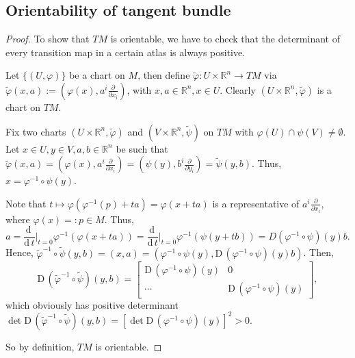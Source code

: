 
{

\newcommand*{\R}{\mathbb{R}} %
\renewcommand*{\d}{\mathrm{d}\,} %
\newcommand*{\D}{\mathrm{D}\,} %


\subsection{Orientability of tangent bundle}

\begin{proof}
To show that $TM$ is orientable, we have to check that the determinant of every transition map in a certain atlas is always positive.
\par
Let $\{(U,\varphi)\}$ be a chart on $M$, then define $\tilde{\varphi}:U\times \R^n \rightarrow TM$ via $\tilde{\varphi}(x,a):=\left(\varphi(x), a^i \frac{\partial}{\partial x_i} \right)$, with $x,a\in \R^n, x\in U$. Clearly $\left(U\times \R^n, \tilde{\varphi} \right)$ is a chart on $TM$.
\par
Fix two charts $\left(U\times \R^n, \tilde{\varphi} \right)$ and $\left(V\times \R^n, \tilde{\psi} \right)$ on $TM$ with $\varphi(U) \cap \psi(V) \ne \emptyset$. Let ${x\in U}, {y\in V}, a,b \in \R^n$ be such that $\tilde{\varphi}(x,a)=\left(\varphi(x), a^i \frac{\partial}{\partial x_i} \right) = \left(\psi(y), b^i \frac{\partial}{\partial y_i} \right) = \tilde{\psi}(y,b)$. Thus, $x = \varphi^{-1}\circ\psi(y)$.
\par
Note that $t\mapsto \varphi\left(\varphi^{-1}(p)+ta \right) = \varphi(x+ta)$ is a representative of $a^i \frac{\partial}{\partial x_i}$, where $\varphi(x)=:p \in M$. Thus,
$$a = \frac{\d}{\d t}\bigg|_{t=0}\varphi^{-1}\left(\varphi(x+ta)\right) = \frac{\d}{\d t}\bigg|_{t=0}\varphi^{-1}\left(\psi(y+tb)\right) = D\left(\varphi^{-1}\circ\psi \right)(y) b.$$
Hence, $\tilde{\varphi}^{-1}\circ\tilde{\psi}(y,b) = (x,a) = \left(\varphi^{-1}\circ\psi(y), \D\left(\varphi^{-1}\circ\psi\right)(y) b \right)$. Then,
$$\D\left(\tilde{\varphi}^{-1}\circ\tilde{\psi}\right)(y,b) = 
\begin{bmatrix}
	\D\left(\varphi^{-1}\circ\psi\right)(y) & 0 \\
	\cdots & \D\left(\varphi^{-1}\circ\psi\right)(y)
\end{bmatrix},
$$
which obviously has positive determinant $\det \D\left(\tilde{\varphi}^{-1}\circ\tilde{\psi}\right)(y,b) = \left[\det \D\left(\varphi^{-1}\circ\psi\right)(y) \right]^2 >0$.
\par
So by definition, $TM$ is orientable.


\end{proof}

}